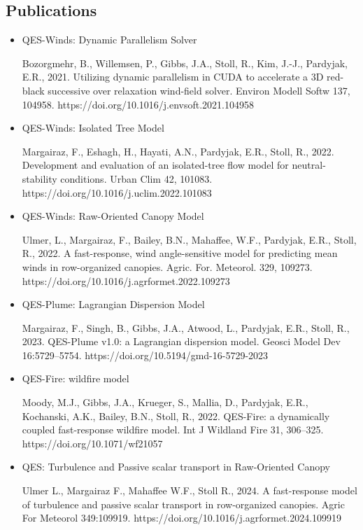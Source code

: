 \subsection{Publications}

\begin{itemize}

\item QES-Winds: Dynamic Parallelism Solver

Bozorgmehr, B., Willemsen, P., Gibbs, J.A., Stoll, R., Kim, J.-J., Pardyjak, E.R., 2021. Utilizing dynamic parallelism in CUDA to accelerate a 3D red-black successive over relaxation wind-field solver. Environ Modell Softw 137, 104958. https://doi.org/10.1016/j.envsoft.2021.104958

\item QES-Winds: Isolated Tree Model

Margairaz, F., Eshagh, H., Hayati, A.N., Pardyjak, E.R., Stoll, R., 2022. Development and evaluation of an isolated-tree flow model for neutral-stability conditions. Urban Clim 42, 101083. https://doi.org/10.1016/j.uclim.2022.101083

\item QES-Winds: Raw-Oriented Canopy Model

Ulmer, L., Margairaz, F., Bailey, B.N., Mahaffee, W.F., Pardyjak, E.R., Stoll, R., 2022. A fast-response, wind angle-sensitive model for predicting mean winds in row-organized canopies. Agric. For. Meteorol. 329, 109273. https://doi.org/10.1016/j.agrformet.2022.109273

\item QES-Plume: Lagrangian Dispersion Model

Margairaz, F., Singh, B., Gibbs, J.A., Atwood, L., Pardyjak, E.R., Stoll, R., 2023. QES-Plume v1.0: a Lagrangian dispersion model. Geosci Model Dev 16:5729–5754. https://doi.org/10.5194/gmd-16-5729-2023

\item QES-Fire: wildfire model

Moody, M.J., Gibbs, J.A., Krueger, S., Mallia, D., Pardyjak, E.R., Kochanski, A.K., Bailey, B.N., Stoll, R., 2022. QES-Fire: a dynamically coupled fast-response wildfire model. Int J Wildland Fire 31, 306–325. https://doi.org/10.1071/wf21057

\item QES: Turbulence and Passive scalar transport in Raw-Oriented Canopy

Ulmer L., Margairaz F., Mahaffee W.F., Stoll R., 2024. A fast-response model of turbulence and passive scalar transport in row-organized canopies. Agric For Meteorol 349:109919. https://doi.org/10.1016/j.agrformet.2024.109919


\end{itemize}


